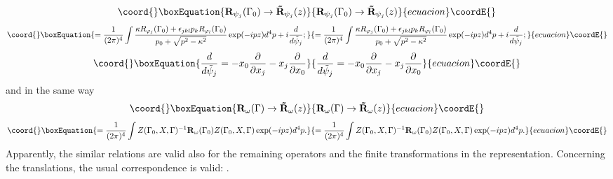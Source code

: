 \documentclass[a4paper,a4paper]{article}
\begin{document}
\begin{equation}\coord{}\boxEquation{
\mathbf{R}_{\psi _{j}}(\Gamma _{0})\rightarrow \mathbf{\tilde{R}}_{\psi
_{j}}(z)  \label{s86}
}{
\mathbf{R}_{\psi _{j}}(\Gamma _{0})\rightarrow \mathbf{\tilde{R}}_{\psi
_{j}}(z)  }{ecuacion}\coordE{}\end{equation}%
\begin{equation*}\coord{}\boxEquation{
=\frac{1}{(2\pi )^{4}}\int \frac{\kappa R_{\varphi _{j}}(\Gamma
_{0})+\epsilon _{jkl}p_{k}R_{\varphi _{l}}(\Gamma _{0})}{p_{0}+\sqrt{
p^{2}-\kappa ^{2}}}\exp (-ipz)d^{4}p+i\frac{d}{d\tilde{\psi}_{j}};
}{
=\frac{1}{(2\pi )^{4}}\int \frac{\kappa R_{\varphi _{j}}(\Gamma
_{0})+\epsilon _{jkl}p_{k}R_{\varphi _{l}}(\Gamma _{0})}{p_{0}+\sqrt{
p^{2}-\kappa ^{2}}}\exp (-ipz)d^{4}p+i\frac{d}{d\tilde{\psi}_{j}};
}{ecuacion}\coordE{}\end{equation*}%
\begin{equation*}\coord{}\boxEquation{
\frac{d}{d\tilde{\psi}_{j}}=-x_{0}\frac{\partial }{\partial x_{j}}-x_{j}
\frac{\partial }{\partial x_{0}}
}{
\frac{d}{d\tilde{\psi}_{j}}=-x_{0}\frac{\partial }{\partial x_{j}}-x_{j}
\frac{\partial }{\partial x_{0}}
}{ecuacion}\coordE{}\end{equation*}%
and in the same way 
\begin{equation}\coord{}\boxEquation{
\mathbf{R}_{\omega }(\Gamma )\rightarrow \mathbf{\tilde{R}}_{\omega }(z)
\label{s87}
}{
\mathbf{R}_{\omega }(\Gamma )\rightarrow \mathbf{\tilde{R}}_{\omega }(z)
}{ecuacion}\coordE{}\end{equation}%
\begin{equation*}\coord{}\boxEquation{
=\frac{1}{(2\pi )^{4}}\int Z(\Gamma _{0},X,\Gamma )^{-1}\mathbf{R}_{\omega
}(\Gamma _{0})Z(\Gamma _{0},X,\Gamma )\exp (-ipz)d^{4}p.
}{
=\frac{1}{(2\pi )^{4}}\int Z(\Gamma _{0},X,\Gamma )^{-1}\mathbf{R}_{\omega
}(\Gamma _{0})Z(\Gamma _{0},X,\Gamma )\exp (-ipz)d^{4}p.
}{ecuacion}\coordE{}\end{equation*}%
Apparently, the similar relations are valid also for the remaining operators 
\coordHE{} and the finite transformations \myHighlight{$\Lambda $}\coordHE{} in the \coordHE{}%
representation. Concerning the translations, the usual correspondence is
valid: \coordHE{}.
\end{document}
